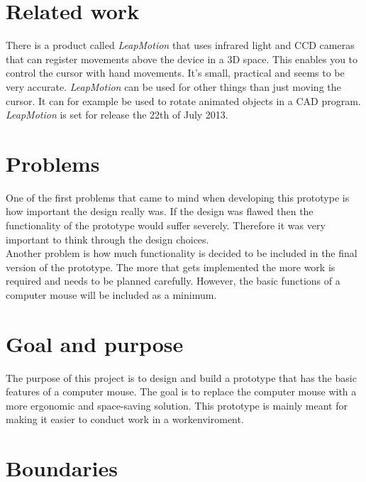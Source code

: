 \section{Related work}
There is a product called \emph{LeapMotion} that uses infrared light and CCD cameras that can
register movements above the device in a 3D space. This enables you to control the cursor with
hand movements. It's small, practical and seems to be very accurate. \emph{LeapMotion} can be
used for other things than just moving the cursor. It can for example be used to rotate animated
objects in a CAD program.\\
\emph{LeapMotion} is set for release the 22th of July 2013.\cite{LeapMotion}

\section{Problems}
One of the first problems that came to mind when developing this prototype is how important 
the design really was. If the design was flawed then the functionality of the prototype would 
suffer severely. Therefore it was very important to think through the design choices.\\

Another problem is how much functionality is decided to be included in the final 
version of the prototype. The more that gets implemented the more work is required
and needs to be planned carefully. However, the basic functions of a computer mouse will be 
included as a minimum.

\section{Goal and purpose}
The purpose of this project is to design and build a prototype that has the basic features of 
a computer mouse. The goal is to replace the computer mouse with a more ergonomic and space-saving
solution. This prototype is mainly meant for making it easier to conduct work in a workenviroment.

\section{Boundaries}
